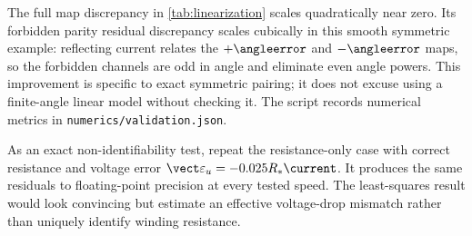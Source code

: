 \begin{table}[tb]
\centering\small
\caption{Maximum Euclidean discrepancy from first-order angle prediction
over the $41\times81$ grid. Exact rotated arguments stay in the stated
polynomial domain. These are absolute normalized errors, not relative errors
at a possibly vanishing signal.}
\label{tab:linearization}
\end{table}
The full map discrepancy in \cref{tab:linearization} scales quadratically
near zero. Its forbidden parity residual discrepancy scales cubically in this
smooth symmetric example: reflecting current relates the $+\angleerror$ and
$-\angleerror$ maps, so the forbidden channels are odd in angle and eliminate
even angle powers. This improvement is specific to exact symmetric pairing;
it does not excuse using a finite-angle linear model without checking it.
The script records numerical metrics in \texttt{numerics/validation.json}.

As an exact non-identifiability test, repeat the resistance-only case with
correct resistance and voltage error $\vect\varepsilon_u=-0.025R_*\current$.
It produces the same residuals to floating-point precision at every tested
speed. The least-squares result would look convincing but estimate an
effective voltage-drop mismatch rather than uniquely identify winding resistance.
